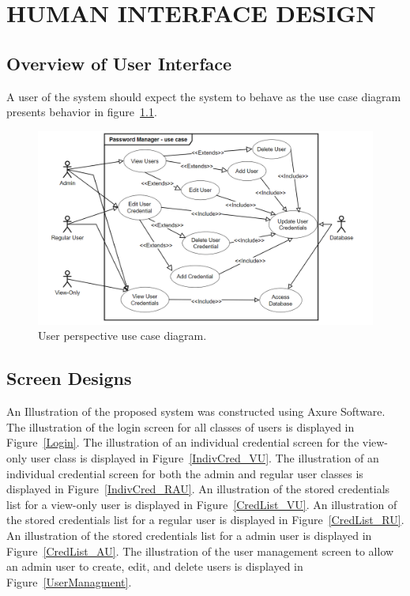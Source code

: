 \documentclass[letterpaper,12pt,oneside,listof=totoc]{scrreprt}
\begin{document}
\chapter{HUMAN INTERFACE DESIGN}
\section{Overview of User Interface}
A user of the system should expect the system to behave as the use case diagram presents behavior in figure~\ref{Usecase}.

\begin{figure}
\centering
\includegraphics[width=\linewidth]{UseCaseDiagramUpdate.png}
\caption{User perspective use case diagram.}
\label{Usecase}
\end{figure}

\section{Screen Designs}

An Illustration of the proposed system was constructed using Axure Software. The illustration of the login screen for all classes of users is displayed in Figure~\ref{Login}. The illustration of an individual credential screen for the view-only user class is displayed in Figure~\ref{IndivCred_VU}. The illustration of an individual credential screen for both the admin and regular user classes is displayed in Figure~\ref{IndivCred_RAU}. An illustration of the stored credentials list for a view-only user is displayed in Figure~\ref{CredList_VU}. An illustration of the stored credentials list for a regular user is displayed in Figure~\ref{CredList_RU}. An illustration of the stored credentials list for a admin user is displayed in Figure~\ref{CredList_AU}. The illustration of the user management screen to allow an admin user to create, edit, and delete users is displayed in Figure~\ref{UserManagment}.
\end{document}
